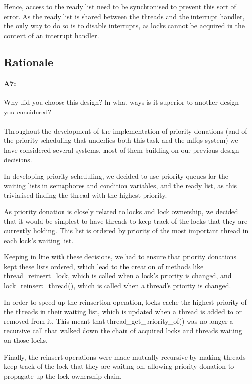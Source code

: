Hence, access to the ready list need to be synchronised to prevent this sort of error. As the ready list is shared between the threads and the interrupt handler, the only way to do so is to disable interrupts, as locks cannot be acquired in the context of an interrupt handler.


\subsection{Rationale}
\paragraph{A7:} %
Why did you choose this design?  In what ways is it superior to another design you considered?
\\
\\
Throughout the development of the implementation of priority donations (and of the priority scheduling that underlies both this task and the mlfqs system) we have considered several systems, most of them building on our previous design decisions.

In developing priority scheduling, we decided to use priority queues for the waiting lists in semaphores and condition variables, and the ready list, as this trivialised finding the thread with the highest priority.

As priority donation is closely related to locks and lock ownership, we decided that it would be simplest to have threads to keep track of the locks that they are currently holding. This list is ordered by priority of the most important thread in each lock's waiting list.

Keeping in line with these decisions, we had to ensure that priority donations kept these lists ordered, which lead to the creation of methods like thread\_reinsert\_lock, which is called when a lock's priority is changed, and lock\_reinsert\_thread(), which is called when a thread's priority is changed.

In order to speed up the reinsertion operation, locks cache the highest priority of the threads in their waiting list, which is updated when a thread is added to or removed from it. This meant that thread\_get\_priority\_of() was no longer a recursive call that walked down the chain of acquired locks and threads waiting on those locks.

Finally, the reinsert operations were made mutually recursive by making threads keep track of the lock that they are waiting on, allowing priority donation to propagate up the lock ownership chain.

